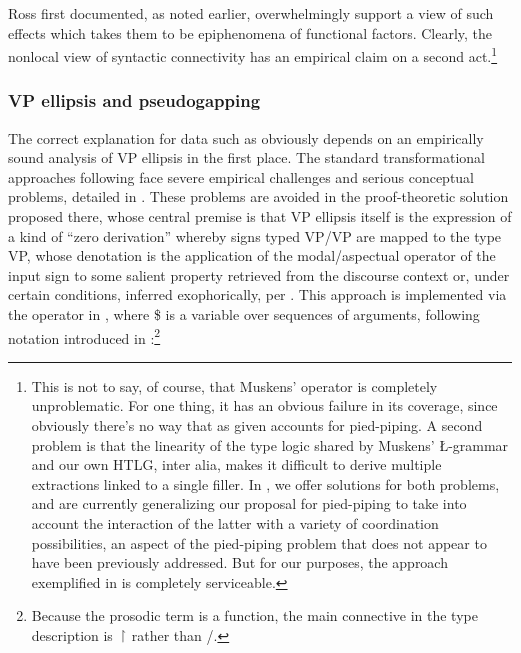 \documentclass[output=paper,colorlinks,citecolor=brown]{langscibook}
\begin{document}
Ross first documented, as noted earlier, overwhelmingly support a view
of such effects which takes them to be epiphenomena of functional
factors. Clearly, the nonlocal view of syntactic connectivity has an
empirical claim on a second act.\footnote{This is not to say, of
course, that Muskens' operator is completely unproblematic. For one
thing, it has an obvious failure in its coverage, since obviously
there's no way that  as given accounts for pied-piping. A
second problem is that the linearity of the type logic shared by
Muskens' \L-grammar and our own HTLG, inter alia, makes it difficult
to derive multiple extractions linked to a single filler. In \citet{kubotalevineBook},
we offer solutions for both problems, and are currently generalizing
our proposal for pied-piping to take into account the interaction of
the latter with a variety of coordination possibilities, an aspect of
the pied-piping problem that does not appear to have been previously
addressed. But for our purposes, the approach exemplified in 
is completely serviceable.}

\subsubsection{VP ellipsis and pseudogapping}\label{subsubsec:VPE}

The correct explanation for data such as  obviously
depends on an empirically sound analysis of VP ellipsis in the first
place. The standard transformational approaches following \citet{kuno1981}
face severe empirical challenges and serious conceptual problems,
detailed in \citet{kubota-levine-pseudo}. These problems are avoided in the
proof-theoretic solution proposed there, whose central premise is that VP
ellipsis itself is the expression of a kind of ``zero derivation''
whereby signs typed VP/VP are mapped to the type VP, whose denotation
is the application of the modal/aspectual operator of the input sign
to some salient property retrieved from the discourse context or,
under certain conditions, inferred exophorically, per
\citet{MillerPullum13}. This approach is implemented via the operator in
, where \$ is a variable over sequences of arguments,
following notation introduced in :\footnote{Because the
prosodic term is a function, the main connective in the type
description is \ensuremath{\vs} rather than /.}
\end{document}
